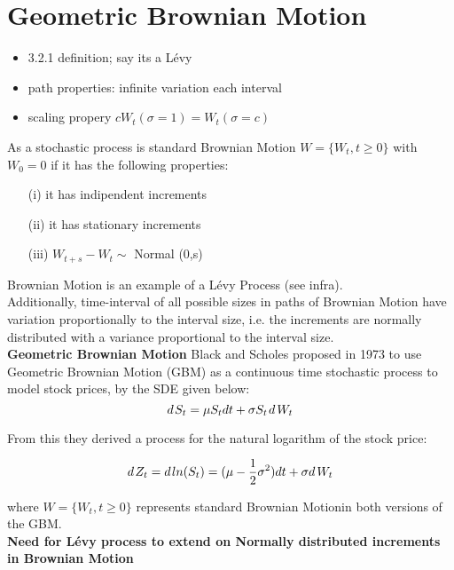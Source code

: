 
\section{Geometric Brownian Motion}


\begin{itemize}
	\item 3.2.1 definition; say its a Lévy
	\item path properties: infinite variation each interval
	\item scaling propery $ cW_{t} (\sigma=1) = W_{t} (\sigma = c)$
\end{itemize}



As a stochastic process is standard Brownian Motion $W = \{ W_{t}, t \geq 0 \} $ with $W_{0} = 0$ if it has the following properties:

\begin{itemize}

\item[(i)] it has indipendent increments
\item[(ii)] it has stationary increments
\item[(iii)] $W_{t+s} - W_{t} \sim$ Normal (0,s)

\end{itemize}

Brownian Motion is an example of a Lévy Process (see infra).\\
Additionally, time-interval of all possible sizes in paths of Brownian Motion have variation proportionally to the interval size, i.e. the increments are normally distributed with a variance proportional to the interval size.\\

\textbf{Geometric Brownian Motion}
Black and Scholes proposed in 1973 to use Geometric Brownian
Motion (GBM) as a continuous time stochastic process to model
stock prices, by the SDE given below:
\begin{equation}
d\hspace{0.1em}S_{t}=\mu S_{t}dt + \sigma S_{t}\hspace{0.1em}
d\hspace{0.15em} W_{t}
\label{eq:BS1}
\end{equation}

From this they derived a process for the natural logarithm of
the stock price:

\begin{equation}
d\hspace{0.1em}Z_{t}=d\hspace{0.1em}ln(S_{t})=(\mu -
\frac{1}{2}\sigma^{2})dt + \sigma d\hspace{0.15em} W_{t}
\label{eq:BS2}
\end{equation}

where $W = \{W_{t},t\geq0\}$ represents standard Brownian Motionin both versions of the GBM.\\

\textbf{Need for Lévy process to extend on Normally distributed
increments in Brownian Motion}\\
